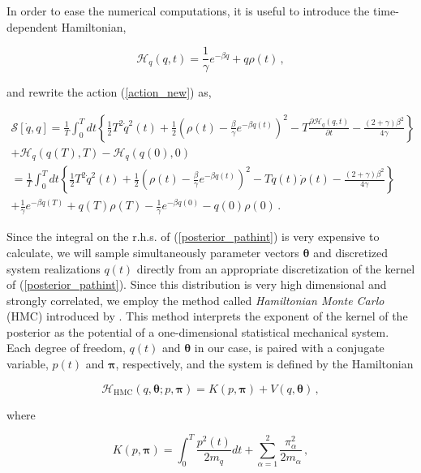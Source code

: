 \documentclass[11pt, a4paper]{article}
\newcommand{\bt}{\pmb\theta}
\begin{document}
In order to ease the numerical computations, it is useful to introduce the time-dependent Hamiltonian,

\begin{equation}\label{H}
  \mathcal{H}_q(q,t)
  =
  \frac{1}{\gamma}e^{-\beta q}+q\rho(t)\,,
\end{equation}

and rewrite the action (\ref{action_new}) as,

\begin{multline}\label{action_final}
{\mathcal S}[\dot{q},q]
=
\frac{1}{T}
\int_0^T dt\left\{
    \frac{1}{2}
    T^2\dot q^2(t) +
    \frac{1}{2}
    \left(\rho(t)-\frac{\beta}{\gamma}e^{-\beta q(t)}\right)^2 -
    T\frac{\partial \mathcal{H}_q(q,t)}{\partial t} -
     \frac{(2+\gamma)\beta^2}{4\gamma}
\right\}
\\
+ \mathcal{H}_q(q(T),T) - \mathcal{H}_q(q(0),0)
\\
= \frac{1}{T}
\int_0^T dt\left\{
    \frac{1}{2}
    T^2\dot q^2(t) +
    \frac{1}{2}
    \left(\rho(t)-\frac{\beta}{\gamma}e^{-\beta q(t)}\right)^2 -
    Tq(t)\dot\rho(t) -
    \frac{(2+\gamma)\beta^2}{4\gamma}
\right\}
\\
+
    \frac{1}{\gamma}e^{-\beta q(T)}+q(T)\rho(T)
   -\frac{1}{\gamma}e^{-\beta q(0)}-q(0)\rho(0)
\,.
\end{multline}

Since the integral on the r.h.s. of (\ref{posterior_pathint}) is very expensive to calculate, we will sample simultaneously parameter vectors $\bt$ and discretized system realizations $q(t)$ directly from an appropriate discretization of the kernel of (\ref{posterior_pathint}).
Since this distribution is very high dimensional and strongly correlated, we employ the method called {\em Hamiltonian Monte Carlo} (HMC) introduced by \cite{duane_1987_HMC}.
This method interprets the exponent of the kernel of the posterior as the potential of a one-dimensional statistical mechanical system. Each degree of freedom, $q(t)$ and $\bt$ in our case, is paired with a conjugate variable, $p(t)$ and ${\pmb\pi}$, respectively, and the system is defined by the  Hamiltonian

\begin{equation}\label{Hamiltonian}
    \mathcal{H}_{\text{HMC}}(q,\bt; p,{\pmb\pi})
    =
    K( p,{\pmb\pi}) + V( q,\bt)\,,
\end{equation}

where

\begin{equation}\label{K}
   K( p,{\pmb\pi})
   =
   \int_0^T \frac{ p^2(t)}{2m_q}dt
   + \sum_{\alpha=1}^2\frac{\pi_\alpha^2}{2m_\alpha}\,,
\end{equation}
\end{document}
